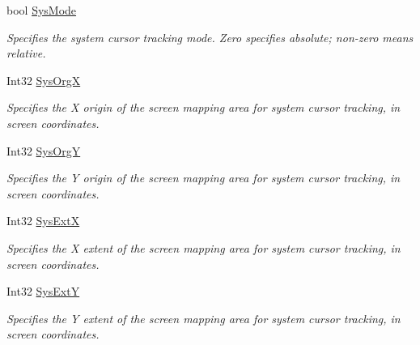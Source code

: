 \begin{DoxyCompactItemize}
bool \hyperlink{class_wintab_d_n_1_1_c_wintab_context_a7db3d4d62f8480bf6a3ed14eadd2d818}{SysMode}
\begin{DoxyCompactList}\small\item\em Specifies the system cursor tracking mode. Zero specifies absolute; non-\/zero means relative. \item\end{DoxyCompactList}\item 
Int32 \hyperlink{class_wintab_d_n_1_1_c_wintab_context_a16fbcf8a36f27eff242c53ecb94a70b7}{SysOrgX}
\begin{DoxyCompactList}\small\item\em Specifies the X origin of the screen mapping area for system cursor tracking, in screen coordinates. \item\end{DoxyCompactList}\item 
Int32 \hyperlink{class_wintab_d_n_1_1_c_wintab_context_a165bbb382ea203f3cfde4e07ea9d9f5c}{SysOrgY}
\begin{DoxyCompactList}\small\item\em Specifies the Y origin of the screen mapping area for system cursor tracking, in screen coordinates. \item\end{DoxyCompactList}\item 
Int32 \hyperlink{class_wintab_d_n_1_1_c_wintab_context_a787e9ded767494fef4fd2647fe4842dd}{SysExtX}
\begin{DoxyCompactList}\small\item\em Specifies the X extent of the screen mapping area for system cursor tracking, in screen coordinates. \item\end{DoxyCompactList}\item 
Int32 \hyperlink{class_wintab_d_n_1_1_c_wintab_context_a832a9049ba42d0728ce72c5af9786781}{SysExtY}
\begin{DoxyCompactList}\small\item\em Specifies the Y extent of the screen mapping area for system cursor tracking, in screen coordinates. \item\end{DoxyCompactList}\item 

\end{DoxyCompactItemize}
